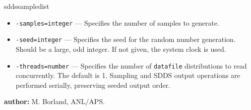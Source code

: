 \begin{sddsprog}{sddssampledist}
\begin{itemize}
      \item \verb|-samples=integer| --- Specifies the number of samples to generate.
      \item \verb|-seed=integer| --- Specifies the seed for the random number generation. Should be a large, odd integer. If not given, the system clock is used.
      \item \verb|-threads=number| --- Specifies the number of \verb|datafile| distributions to read concurrently. The default is 1. Sampling and SDDS output operations are performed serially, preserving seeded output order.
    \end{itemize}
  \item \textbf{author:} M. Borland, ANL/APS.
\end{sddsprog}
